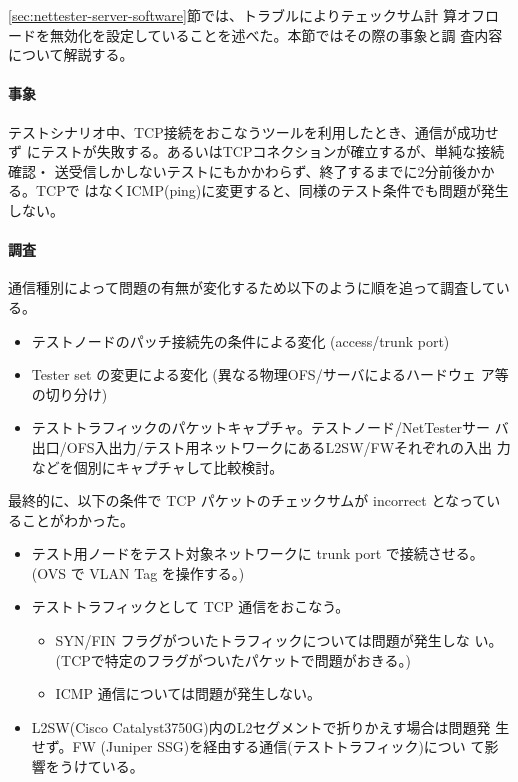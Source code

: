 \ref{sec:nettester-server-software}節では、トラブルによりテェックサム計
算オフロードを無効化を設定していることを述べた。本節ではその際の事象と調
査内容について解説する。

    \paragraph{事象}
テストシナリオ中、TCP接続をおこなうツールを利用したとき、通信が成功せず
にテストが失敗する。あるいはTCPコネクションが確立するが、単純な接続確認・
送受信しかしないテストにもかかわらず、終了するまでに2分前後かかる。TCPで
はなくICMP(ping)に変更すると、同様のテスト条件でも問題が発生しない。

    \paragraph{調査}
通信種別によって問題の有無が変化するため以下のように順を追って調査している。
\begin{itemize}
 \item テストノードのパッチ接続先の条件による変化 (access/trunk port)
 \item Tester set の変更による変化 (異なる物理OFS/サーバによるハードウェ
       ア等の切り分け)
 \item テストトラフィックのパケットキャプチャ。テストノード/NetTesterサー
       バ出口/OFS入出力/テスト用ネットワークにあるL2SW/FWそれぞれの入出
       力などを個別にキャプチャして比較検討。
\end{itemize}

最終的に、以下の条件で TCP パケットのチェックサムが incorrect となってい
ることがわかった。
\begin{itemize}
 \item テスト用ノードをテスト対象ネットワークに trunk port で接続させる。
       (OVS で VLAN Tag を操作する。)
 \item テストトラフィックとして TCP 通信をおこなう。
       \begin{itemize}
        \item SYN/FIN フラグがついたトラフィックについては問題が発生しな
              い。(TCPで特定のフラグがついたパケットで問題がおきる。)
        \item ICMP 通信については問題が発生しない。
       \end{itemize}
 \item L2SW(Cisco Catalyst3750G)内のL2セグメントで折りかえす場合は問題発
       生せず。FW (Juniper SSG)を経由する通信(テストトラフィック)につい
       て影響をうけている。
\end{itemize}


